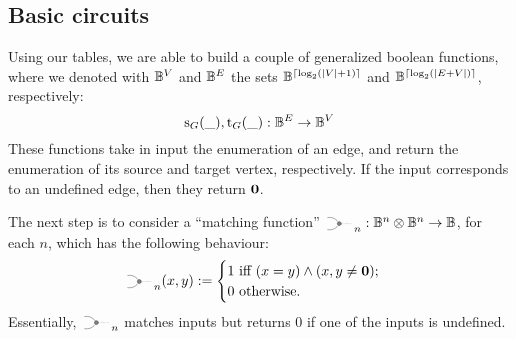 \documentclass[preliminary,copyright,creativecommons,sharealike,noncommercial]{eptcs}
\begin{document}
\subsection{Basic circuits}
%
%
Using our tables, we are able to build a couple of generalized 
boolean functions, where we denoted with $\mathbb{B}^V$ and $\mathbb{B}^E$
the sets $\mathbb{B}^{ \lceil \log_2 (|V|+1) \rceil}$ and 
$\mathbb{B}^{\lceil \log_2 (|E+V|) \rceil}$, respectively:
%
%
\begin{equation*}
  \operatorname{s}_{G}(\_), \operatorname{t}_{G}(\_): \mathbb{B}^E \to \mathbb{B}^V 
\end{equation*}
%
These functions take in input the enumeration of an edge, 
and return the enumeration of its source and target vertex, respectively. 
If the input corresponds to an undefined edge, then they return $\textbf{0}$.

The next step is to consider a ``matching function'' 
$\MATCHSym_n: \Bool^n \Tensor \Bool^n \to \Bool$, for each $n$, 
which has the following behaviour:
%
%
\begin{equation*}
  \MATCHSym_n (x,y) := \begin{cases}
    1 \text{ iff } (x = y) \wedge (x,y \neq \Zero);\\
    0 \text{ otherwise}.
  \end{cases}
\end{equation*}
%
Essentially, $\MATCHSym_n$ matches inputs but returns $0$ if one 
of the inputs is undefined. 
\end{document}
